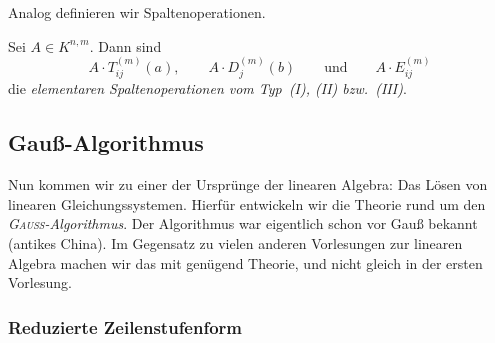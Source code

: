 \documentclass[a4paper]{article}
\begin{document}
Analog definieren wir Spaltenoperationen.

\begin{definition}[Spaltenoperationen]
    Sei $A \in K^{n,m}$. Dann sind
    \begin{equation*}
        A \cdot T_{ij}^{(m)}(a),\qquad A \cdot D_j^{(m)}(b) \qquad\text{und}\qquad A \cdot E_{ij}^{(m)}
    \end{equation*}
    die \emph{elementaren Spaltenoperationen vom Typ~(I), (II) bzw.~(III)}.
\end{definition}

\subsection{Gauß-Algorithmus}

Nun kommen wir zu einer der Ursprünge der linearen Algebra: Das Lösen von linearen Gleichungssystemen. Hierfür entwickeln wir die Theorie rund um den \emph{\textsc{Gauß}-Algorithmus}. Der Algorithmus war eigentlich schon vor Gauß bekannt (antikes China). Im Gegensatz zu vielen anderen Vorlesungen zur linearen Algebra machen wir das mit genügend Theorie, und nicht gleich in der ersten Vorlesung.

\subsubsection{Reduzierte Zeilenstufenform}
\end{document}
